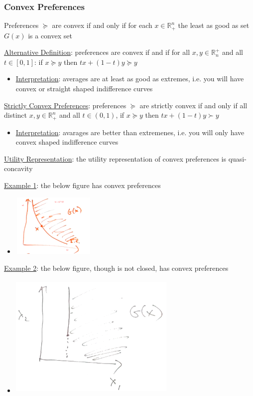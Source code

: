 \documentclass{article}
\begin{document}
\subsubsection{Convex Preferences}
Preferences $\succeq$ are convex if and only if for each $x \in \mathbb{R}_{+}^{n}$ the least as good as set $G(x)$ is a convex set \par \vspace{0.3em}
  \underline{Alternative Definition}: preferences are convex if and if for all $x, y \in \mathbb{R}_{n}^{+}$ and all $t \in [0,1]$: if $x \succeq y$ then $tx + (1-t)y \succeq y$
  \begin{itemize}
    \item  \underline{Interpretation}: averages are at least as good as extremes, i.e. you will have convex or straight shaped indifference curves
  \end{itemize}
  \par
  \underline{Strictly Convex Preferences}: preferences $\succeq$ are strictly convex if and only if all distinct $x,y \in \mathbb{R}_{+}^{n}$ and all $t \in (0,1)$, if $x \succeq y$ then $tx + (1-t)y \succ y$
  \begin{itemize}
    \item  \underline{Interpretation}: avarages are better than extremenes, i.e. you will only have convex shaped indifference curves
  \end{itemize}
  \par
  \underline{Utility Representation}: the utility representation of convex preferences is quasi-concavity
  \par
  \underline{Example 1}: the below figure has convex preferences
  \begin{itemize}
    \item  \includegraphics[width=4cm, height=3cm]{pic16}
  \end{itemize}
  \par
  \underline{Example 2}: the below figure, though is not closed, has convex preferences
  \begin{itemize}
    \item  \includegraphics[width=8cm, height=6cm]{pic17}
  \end{itemize}
  \par
\vspace{6mm}
\end{document}
